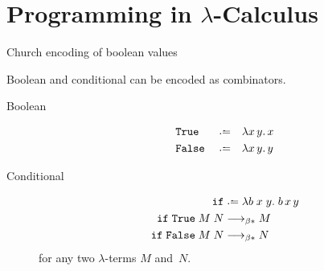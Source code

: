 \section{Programming in $\lambda$-Calculus}
\begin{frame}{Church encoding of boolean values}
  
Boolean and conditional can be encoded as combinators.
  
\begin{description}
  \item[Boolean]
    \begin{align*}
      & \mathtt{True}  && \defeq && \lambda x\,y.\, x \\
      & \mathtt{False} && \defeq && \lambda x\,y.\, y
    \end{align*}

  \item[Conditional]
    \begin{align*}
      \mathtt{if} & \defeq \lambda b\;x\;y.\;b\,x\,y  \\
      \mathtt{if} \;\mathtt{True} \;M\;N &\reduce M \\
      \mathtt{if} \;\mathtt{False}\;M\;N &\reduce N
    \end{align*}
    for any two $\lambda$-terms $M$ and~$N$.
\end{description}

\end{frame}
